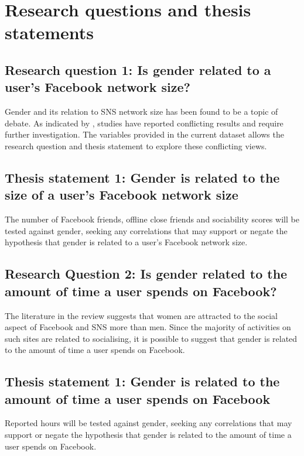 \section{Research questions and thesis statements}

\subsection{Research question 1: Is gender related to a user's Facebook network size?}

Gender and its relation to SNS network size has been found to be a topic of debate. As indicated by \citet{Tifferet2014}, studies have reported conflicting results and require further investigation. The variables provided in the current dataset allows the research question and thesis statement to explore these conflicting views.

\subsection{Thesis statement 1: Gender is related to the size of a user's Facebook network size}

The number of Facebook friends, offline close friends and sociability scores will be tested against gender, seeking any correlations that may support or negate the hypothesis that gender is related to a user's Facebook network size. 

\subsection{Research Question 2: Is gender related to the amount of time a user spends on Facebook?}

The literature in the review suggests that women are attracted to the social aspect of Facebook and SNS more than men. Since the majority of activities on such sites are related to socialising, it is possible to suggest that gender is related to the amount of time a user spends on Facebook.

\subsection{Thesis statement 1: Gender is related to the amount of time a user spends on Facebook}

Reported hours will be tested against gender, seeking any correlations that may support or negate the hypothesis that gender is related to the amount of time a user spends on Facebook.


